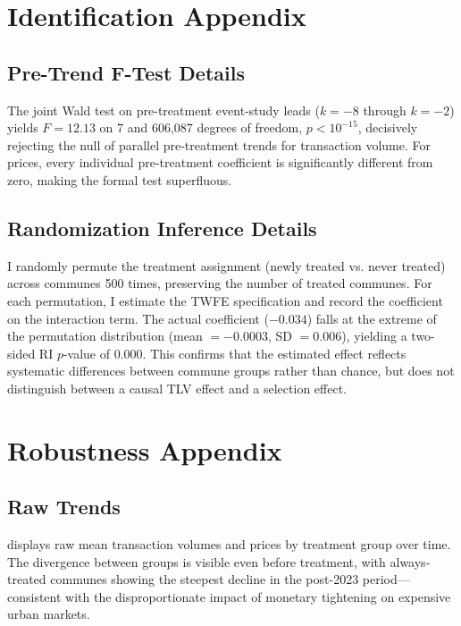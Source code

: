 \documentclass[12pt]{article}
\begin{document}
\section{Identification Appendix}\label{app:identification}

\subsection{Pre-Trend F-Test Details}

The joint Wald test on pre-treatment event-study leads ($k = -8$ through $k = -2$) yields $F = 12.13$ on 7 and 606,087 degrees of freedom, $p < 10^{-15}$, decisively rejecting the null of parallel pre-treatment trends for transaction volume. For prices, every individual pre-treatment coefficient is significantly different from zero, making the formal test superfluous.

\subsection{Randomization Inference Details}

I randomly permute the treatment assignment (newly treated vs. never treated) across communes 500 times, preserving the number of treated communes. For each permutation, I estimate the TWFE specification and record the coefficient on the interaction term. The actual coefficient ($-0.034$) falls at the extreme of the permutation distribution (mean $= -0.0003$, SD $= 0.006$), yielding a two-sided RI $p$-value of 0.000. This confirms that the estimated effect reflects systematic differences between commune groups rather than chance, but does not distinguish between a causal TLV effect and a selection effect.


\section{Robustness Appendix}\label{app:robustness}

\subsection{Raw Trends}

 displays raw mean transaction volumes and prices by treatment group over time. The divergence between groups is visible even before treatment, with always-treated communes showing the steepest decline in the post-2023 period---consistent with the disproportionate impact of monetary tightening on expensive urban markets.
\end{document}
